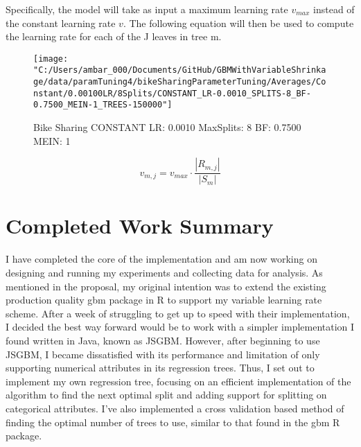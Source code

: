 \documentclass[runningheads]{llncs_2}
\begin{document}
Specifically, the model will take as input a maximum learning rate \(v_{max}\) instead of the constant learning rate \(v\). The following equation will then be used to compute the learning rate for each of the J leaves in tree m.

\begin{figure}[!htb]\centering
	\texttt{[image: "C:/Users/ambar\_000/Documents/GitHub/GBMWithVariableShrinkage/data/paramTuning4/bikeSharingParameterTuning/Averages/Constant/0.00100LR/8Splits/CONSTANT\_LR-0.0010\_SPLITS-8\_BF-0.7500\_MEIN-1\_TREES-150000"]}
	\caption{Bike Sharing CONSTANT LR: 0.0010 MaxSplits: 8 BF: 0.7500 MEIN: 1}
	\label{fig:BikeSharingCONSTANTLR0.0010MaxSplits8BF0.7500MEIN1}
\end{figure}

\begin{equation}
	v_{m,j} = v_{max}  \cdot  \frac{|R_{m,j}|}{|S_m|}
	\label{eq:adaptRule1}
\end{equation}

\section{Completed Work Summary}

I have completed the core of the implementation and am now working on designing and running my experiments and collecting data for analysis. As mentioned in the proposal, my original intention was to extend the existing production quality gbm package in R to support my variable learning rate scheme. After a week of struggling to get up to speed with their implementation, I decided the best way forward would be to work with a simpler implementation I found written in Java, known as JSGBM. However, after beginning to use JSGBM, I became dissatisfied with its performance and limitation of only supporting numerical attributes in its regression trees. Thus, I set out to implement my own regression tree, focusing on an efficient implementation of the algorithm to find the next optimal split and adding support for splitting on categorical attributes. I've also implemented a cross validation based method of finding the optimal number of trees to use, similar to that found in the gbm R package. 
\end{document}
